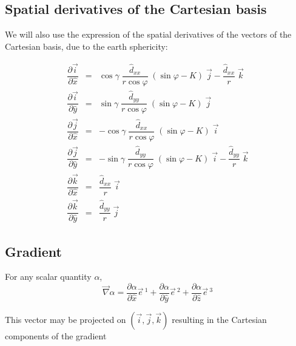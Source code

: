 \subsection{Spatial derivatives of the Cartesian basis}

We will also use the expression of the spatial derivatives of the
vectors of the Cartesian basis, due to the earth sphericity:

\begin{eqnarray}
\dfrac{\partial \vec{i}}{\partial \widehat{x}} & = & \cos\gamma \;
\dfrac{\widehat{d}_{xx}}{r \cos\varphi}  \; (\sin\varphi - K)
\;\vec{j} -   \dfrac{\widehat{d}_{xx}}{r} \;  \vec{k} \nonumber \\
\dfrac{\partial \vec{i}}{\partial \widehat{y}} & = & \sin\gamma \;
\dfrac{\widehat{d}_{yy}}{r \cos\varphi}  \; (\sin\varphi - K)
\;\vec{j} \nonumber \\
\dfrac{\partial \vec{j}}{\partial \widehat{x}} & = & -\cos\gamma \;
\dfrac{\widehat{d}_{xx}}{r \cos\varphi}  \; (\sin\varphi - K)
\;\vec{i}  \\
\dfrac{\partial \vec{j}}{\partial \widehat{y}} & = & - \sin\gamma \;
\dfrac{\widehat{d}_{yy}}{r \cos\varphi}  \; (\sin\varphi - K)
\;\vec{i} -  \dfrac{\widehat{d}_{yy}}{r} \;  \vec{k} \nonumber \\
\dfrac{\partial \vec{k}}{\partial \widehat{x}} & = & \dfrac{\widehat{d}_{xx}}{r}
\;\vec{i} \nonumber \\
\dfrac{\partial \vec{k}}{\partial \widehat{y}} & = & \dfrac{\widehat{d}_{yy}}{r}
\;\vec{j} \nonumber
\end{eqnarray}


\subsection{Gradient}

For any scalar quantity $\alpha$,
\begin{equation}
\vec{\nabla} \alpha =
\dfrac{\partial \alpha }{\partial \widehat{x}}\vec{e} \, ^{1} +
\dfrac{\partial \alpha }{\partial \widehat{y}}\vec{e} \, ^{2} +
\dfrac{\partial \alpha }{\partial \widehat{z}}\vec{e} \, ^{3}
\end{equation}

This vector may be projected on $(\vec{i},\vec{j},\vec{k})$ resulting in
the Cartesian components of the gradient

